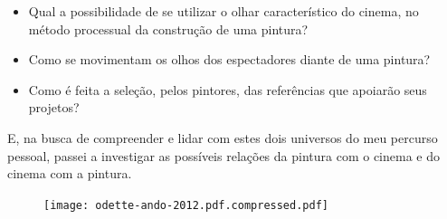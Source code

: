 \begin{itemize}
	\item Qual a possibilidade de se utilizar o olhar característico do cinema,
	      no método processual da construção de uma pintura?

	\item Como se movimentam os olhos dos espectadores diante de uma pintura?

	\item Como é feita a seleção, pelos pintores, das referências que apoiarão
	      seus projetos?
\end{itemize}
\noindent E, na busca de compreender e lidar com estes dois universos do meu
percurso pessoal, passei a investigar as possíveis relações da pintura
com o cinema e do cinema com a pintura.

\begin{figure}[t]
  \caption{}

	\texttt{[image: odette-ando-2012.pdf.compressed.pdf]}
\end{figure}

